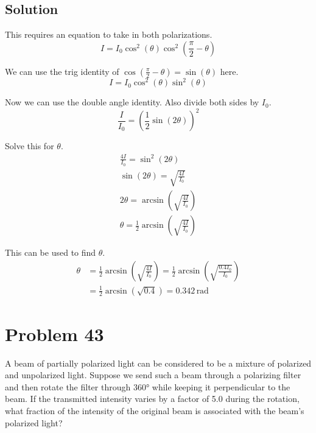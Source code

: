 \documentclass[12pt]{article}
\begin{document}
        \subsection{Solution}
            This requires an equation to take in both polarizations.
            \begin{equation}
                I = I_0 \cos^2 (\theta) \cos^2 \left( \frac{\pi}{2} - \theta \right)
            \end{equation}

            We can use the trig identity of $\cos\left( \frac{\pi}{2} - \theta \right) = \sin(\theta)$ here.
            \begin{equation}
                I = I_0 \cos^2 (\theta) \sin^2 ( \theta )
            \end{equation}

            Now we can use the double angle identity.
            Also divide both sides by $I_0$.
            \begin{equation}
                \frac{I}{I_0} = \left( \frac{1}{2}\sin(2\theta) \right)^2
            \end{equation}

            Solve this for $\theta$.
            \begin{gather}
                \frac{4I}{I_0} = \sin^2(2\theta)\\
                \sin(2\theta) = \sqrt{\frac{4I}{I_0}}\\
                2\theta = \arcsin\left( \sqrt{\frac{4I}{I_0}} \right)\\
                \theta = \frac{1}{2} \arcsin\left( \sqrt{\frac{4I}{I_0}} \right)
            \end{gather}

            This can be used to find $\theta$.
            \begin{align}
                \theta  &=  \frac{1}{2} \arcsin\left( \sqrt{\frac{4I}{I_0}} \right)
                    =   \frac{1}{2} \arcsin\left( \sqrt{\frac{0.4 I_0}{I_0}} \right)\\
                    &=  \frac{1}{2} \arcsin\left( \sqrt{0.4} \right)
                    =   \boxed{0.342\,\unit{\radian}}
            \end{align}

    \pagebreak
    \section{Problem 43}
        A beam of partially polarized light can be considered to be a mixture of polarized and unpolarized light. 
        Suppose we send such a beam through a polarizing filter and then rotate the filter through 360\unit{\degree} while keeping it perpendicular to the beam. 
        If the transmitted intensity varies by a factor of 5.0 during the rotation, what fraction of the intensity of the original beam is associated with the beam's polarized light?
\end{document}
